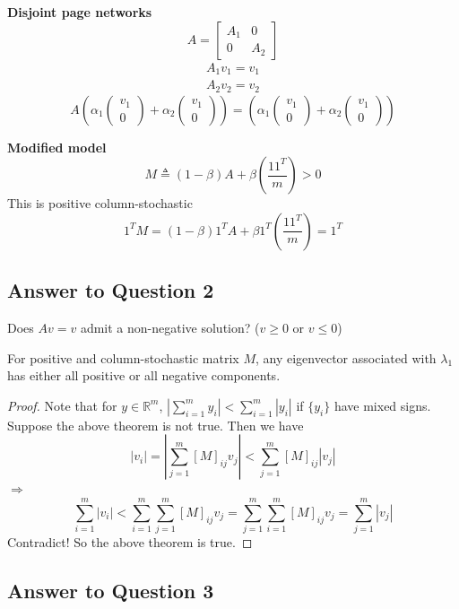 \begin{multicols}{2}
\textbf{Disjoint page networks}
\[
    A = \begin{bmatrix}
        A_1 & 0 \\ 0 & A_2
    \end{bmatrix}
\]
\[
    \begin{array}{l}
        A_1 v_1 = v_1 \\ A_2 v_2 = v_2
    \end{array}
\]
\[
    A
    \left( \alpha_1 \left(\begin{array}{c} v_1 \\ 0 \end{array}\right) + \alpha_2 \left(\begin{array}{c} v_1 \\ 0 \end{array}\right) \right) 
    = 
    \left( \alpha_1 \left(\begin{array}{c} v_1 \\ 0 \end{array}\right) + \alpha_2 \left(\begin{array}{c} v_1 \\ 0 \end{array}\right) \right) 
\]

\textbf{Modified model}
\[
    M \triangleq (1-\beta) A + \beta \left( \frac{11^T}{m} \right) > 0
\]
This is positive column-stochastic
\[
    1^TM = (1-\beta)1^TA + \beta 1^T \left( \frac{11^T}{m} \right) = 1^T
\]

\subsection{Answer to Question 2}
Does $Av=v$ admit a non-negative solution? ($v\geq 0$ or $v\leq 0$)

\begin{theorem}
    For positive and column-stochastic matrix $M$, any eigenvector associated with $\lambda_1$ has either all positive or all negative components.
\end{theorem}
\begin{proof}
    Note that for $y\in\mathbb{R}^m$, $|\sum_{i=1}^m y_i| < \sum_{i=1}^m |y_i|$ if $\{y_i\}$ have mixed signs. \\
    Suppose the above theorem is not true. Then we have
    \[
        |v_i| = |\sum_{j=1}^m [M]_{ij}v_j| < \sum_{j=1}^m [M]_{ij}|v_j|
    \]
    $\Longrightarrow$
    \[
        \sum_{i=1}^m |v_i| < \sum_{i=1}^m \sum_{j=1}^m [M]_{ij}v_j = \sum_{j=1}^m\sum_{i=1}^m  [M]_{ij}v_j = \sum_{j=1}^m |v_j|
    \]
    Contradict! So the above theorem is true.
\end{proof}

\subsection{Answer to Question 3}

\newpage
\end{multicols}